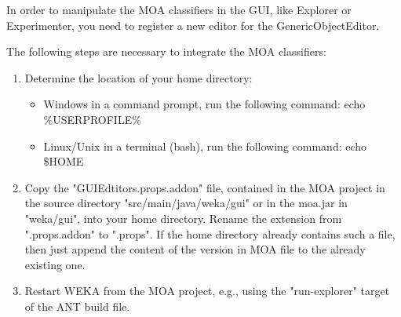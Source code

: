 \documentclass[a4paper,12pt,twoside]{book}
\begin{document}
In order to manipulate the MOA classifiers in the GUI, like Explorer or
Experimenter, you need to register a new editor for the GenericObjectEditor.

The following steps are necessary to integrate the MOA classifiers:
\begin{enumerate}
 \item Determine the location of your home directory:
\begin{itemize}
 \item  Windows
     in a command prompt, run the following command:
       echo \%USERPROFILE\%
 \item Linux/Unix
     in a terminal (bash), run the following command:
       echo \$HOME
\end{itemize}
\item Copy the "GUIEdtitors.props.addon" file, contained in the MOA project in the 
   source directory "src/main/java/weka/gui" or in the moa.jar in "weka/gui",
   into your home directory. Rename the extension from ".props.addon" to 
   ".props". If the home directory already contains such a file, then just 
   append the content of the version in MOA file to the already existing one.

\item Restart WEKA from the MOA project, e.g., using the "run-explorer" target of
   the ANT build file.
\end{enumerate}   
\end{document}
